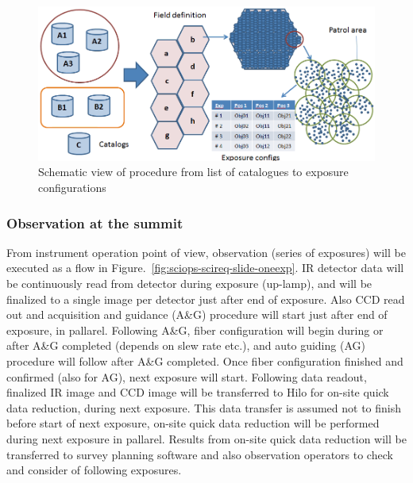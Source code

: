 \documentclass[a4paper,notitlepage]{article}
\begin{document}
\begin{figure}[htb]
  \begin{center}
    \includegraphics[width=.75\linewidth]{sciops-scireq-slide-svyexp.png}
  \end{center}
  \caption{Schematic view of procedure from list of catalogues to exposure 
    configurations}
  \label{fig:sciops-scireq-slide-svyexp}
\end{figure}


\subsubsection{Observation at the summit}
\label{sec:background:survey:summit}

From instrument operation point of view, observation (series of exposures) 
will be executed as a flow in Figure.~\ref{fig:sciops-scireq-slide-oneexp}. 
IR detector data will be continuously read from detector during exposure 
(up-lamp), and will be finalized to a single image per detector just after 
end of exposure. Also CCD read out and acquisition and guidance (A\&G) 
procedure will start just after end of exposure, in pallarel. 
Following A\&G, fiber configuration will begin during or after A\&G completed 
(depends on slew rate etc.), and auto guiding (AG) procedure will follow 
after A\&G completed. 
Once fiber configuration finished and confirmed (also for AG), next exposure 
will start. 
Following data readout, finalized IR image and CCD image will be transferred 
to Hilo for on-site quick data reduction, during next exposure. 
This data transfer is assumed not to finish before start of next exposure, 
on-site quick data reduction will be performed during next exposure in 
pallarel. 
Results from on-site quick data reduction will be transferred to survey 
planning software and also observation operators to check and consider of 
following exposures. 
\end{document}

